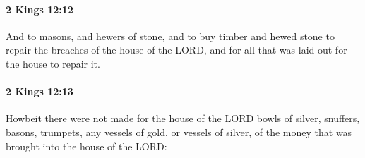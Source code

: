 		\paragraph{2 Kings 12:12} %
			\label{2KINGS-12-12}

			And to masons, and hewers of stone, and to buy timber and hewed stone to repair the breaches of the house of the LORD, and for all that was laid out for the house to repair it.


		\paragraph{2 Kings 12:13} %
			\label{2KINGS-12-13}

			Howbeit there were not made for the house of the LORD bowls of silver, snuffers, basons, trumpets, any vessels of gold, or vessels of silver, of the money that was brought into the house of the LORD:

